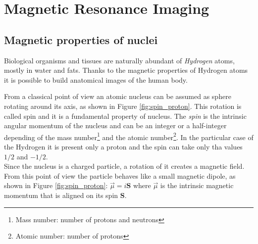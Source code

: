 \section{Magnetic Resonance Imaging}
 \subsection{Magnetic properties of nuclei}
 Biological organisms and tissues are naturally abundant of \emph{Hydrogen} atoms, mostly in water and fats. Thanks to the magnetic properties of Hydrogen atoms it is possible to build anatomical images of the human body.

 From a classical point of view an atomic nucleus can be assumed as sphere rotating around its axis, as shown in Figure \ref{fig:spin_proton}. This rotation is called spin and it is a fundamental property of nucleus. The \emph{spin} is the intrinsic angular momentum of the nucleus and can be an integer or a half-integer depending of the mass number\footnote{Mass number: number of protons and neutrons} and the atomic number\footnote{Atomic number: number of protons}. In the particular case of the Hydrogen it is present only a proton and the spin can take only tha values $1/2$ and $-1/2$. \cite{slides} \\
 Since the nucleus is a charged particle, a rotation of it creates a magnetic field. From this point of view the particle behaves like a small magnetic dipole, as shown in Figure \ref{fig:spin_proton}: $ \vec{\mu} =i\mathbf{S}$ where $\vec{\mu}$ is the intrinsic magnetic momentum that is aligned on its spin $\mathbf{S}$.

